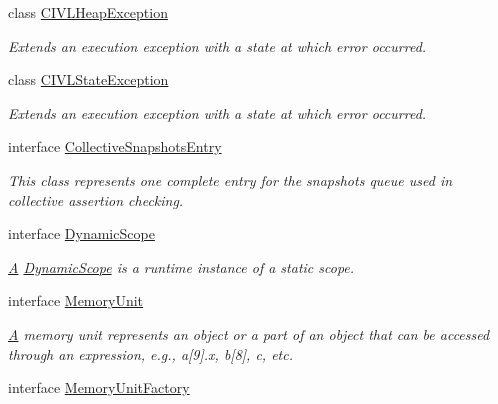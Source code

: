 \begin{DoxyCompactItemize}
\item 
class \hyperlink{classedu_1_1udel_1_1cis_1_1vsl_1_1civl_1_1state_1_1IF_1_1CIVLHeapException}{C\+I\+V\+L\+Heap\+Exception}
\begin{DoxyCompactList}\small\item\em Extends an execution exception with a state at which error occurred. \end{DoxyCompactList}\item 
class \hyperlink{classedu_1_1udel_1_1cis_1_1vsl_1_1civl_1_1state_1_1IF_1_1CIVLStateException}{C\+I\+V\+L\+State\+Exception}
\begin{DoxyCompactList}\small\item\em Extends an execution exception with a state at which error occurred. \end{DoxyCompactList}\item 
interface \hyperlink{interfaceedu_1_1udel_1_1cis_1_1vsl_1_1civl_1_1state_1_1IF_1_1CollectiveSnapshotsEntry}{Collective\+Snapshots\+Entry}
\begin{DoxyCompactList}\small\item\em This class represents one complete entry for the snapshots queue used in collective assertion checking. \end{DoxyCompactList}\item 
interface \hyperlink{interfaceedu_1_1udel_1_1cis_1_1vsl_1_1civl_1_1state_1_1IF_1_1DynamicScope}{Dynamic\+Scope}
\begin{DoxyCompactList}\small\item\em \hyperlink{structA}{A} \hyperlink{interfaceedu_1_1udel_1_1cis_1_1vsl_1_1civl_1_1state_1_1IF_1_1DynamicScope}{Dynamic\+Scope} is a runtime instance of a static scope. \end{DoxyCompactList}\item 
interface \hyperlink{interfaceedu_1_1udel_1_1cis_1_1vsl_1_1civl_1_1state_1_1IF_1_1MemoryUnit}{Memory\+Unit}
\begin{DoxyCompactList}\small\item\em \hyperlink{structA}{A} memory unit represents an object or a part of an object that can be accessed through an expression, e.\+g., a\mbox{[}9\mbox{]}.x, b\mbox{[}8\mbox{]}, c, etc. \end{DoxyCompactList}\item 
interface \hyperlink{interfaceedu_1_1udel_1_1cis_1_1vsl_1_1civl_1_1state_1_1IF_1_1MemoryUnitFactory}{Memory\+Unit\+Factory}
\item 

\end{DoxyCompactItemize}
